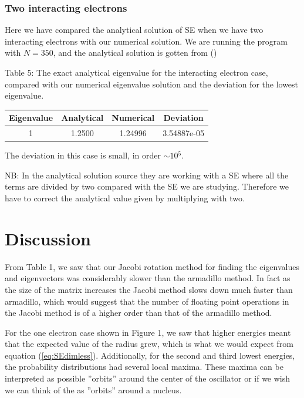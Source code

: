 \documentclass[norsk,a4paper,12pt]{article}
\begin{document}
\subsubsection{Two interacting electrons}
Here we have compared the analytical solution of SE when we have two interacting electrons with our numerical solution. We are running the program with $N=350$, and the analytical solution is gotten from (\cite {M. Taut})\par
Table 5: The exact analytical eigenvalue for the interacting electron case, compared with our numerical eigenvalue solution and the deviation for the lowest eigenvalue.\par\vspace{5mm}
\begin{tabular}{|c|c|c|c|}\hline
     {\bf Eigenvalue} & {\bf Analytical} & {\bf Numerical} & {\bf Deviation}\\ \hline
     1 & 1.2500 & 1.24996 & 3.54887e-05\\ \hline
\end{tabular}\par\vspace{5mm}
The deviation in this case is small, in order $\sim 10{^5}$.\par
NB: In the analytical solution source they are working with a SE where all the terms are divided by two compared with the SE we are studying. Therefore we have to correct the analytical value given by multiplying with two. 

\section{Discussion}
From Table 1, we saw that our Jacobi rotation method for finding the eigenvalues and eigenvectors was considerably slower than the armadillo method. In fact as the size of the matrix increases the Jacobi method slows down much faster than armadillo, which would suggest that the number of floating point operations in the Jacobi method is of a higher order than that of the armadillo method. 

For the one electron case shown in Figure 1, we saw that higher energies meant that the expected value of the radius grew, which is what we would expect from equation (\ref{eq:SEdimless}). Additionally, for the second and third lowest energies, the probability distributions had several local maxima. These maxima can be interpreted as possible ''orbits'' around the center of the oscillator or if we wish we can think of the as ''orbits'' around a nucleus.
\end{document}

